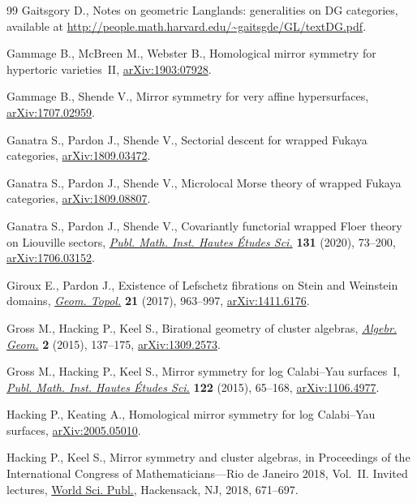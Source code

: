 \documentclass[10pt,a4paper]{amsart}
\numberwithin{equation}{section}
\begin{document}
\begin{thebibliography}{99}
Gaitsgory D., Notes on geometric {L}anglands: generalities on {DG} categories,
 available at \url{http://people.math.harvard.edu/~gaitsgde/GL/textDG.pdf}.

Gammage B., McBreen M., Webster B., Homological mirror symmetry for hypertoric
 varieties~{II}, \href{https://arxiv.org/abs/1903:07928}{arXiv:1903:07928}.

Gammage B., Shende V., Mirror symmetry for very affine hypersurfaces,
 \href{https://arxiv.org/abs/1707.02959}{arXiv:1707.02959}.

Ganatra S., Pardon J., Shende V., Sectorial descent for wrapped {F}ukaya
 categories, \href{https://arxiv.org/abs/1809.03472}{arXiv:1809.03472}.

Ganatra S., Pardon J., Shende V., Microlocal {M}orse theory of wrapped {Fukaya}
 categories, \href{https://arxiv.org/abs/1809.08807}{arXiv:1809.08807}.

Ganatra S., Pardon J., Shende V., Covariantly functorial wrapped {F}loer theory
 on {L}iouville sectors, \href{https://doi.org/10.1007/s10240-019-00112-x}{\textit{Publ. Math. Inst. Hautes \'Etudes Sci.}}
 \textbf{131} (2020), 73--200, \href{https://arxiv.org/abs/1706.03152}{arXiv:1706.03152}.


Giroux E., Pardon J., Existence of {L}efschetz fibrations on {S}tein and
 {W}einstein domains, \href{https://doi.org/10.2140/gt.2017.21.963}{\textit{Geom. Topol.}} \textbf{21} (2017), 963--997,
 \href{https://arxiv.org/abs/1411.6176}{arXiv:1411.6176}.

Gross M., Hacking P., Keel S., Birational geometry of cluster algebras,
 \href{https://doi.org/10.14231/AG-2015-007}{\textit{Algebr. Geom.}} \textbf{2} (2015), 137--175, \href{https://arxiv.org/abs/1309.2573}{arXiv:1309.2573}.

Gross M., Hacking P., Keel S., Mirror symmetry for log {C}alabi--{Y}au
 surfaces~{I}, \href{https://doi.org/10.1007/s10240-015-0073-1}{\textit{Publ. Math. Inst. Hautes \'Etudes Sci.}} \textbf{122}
 (2015), 65--168, \href{https://arxiv.org/abs/1106.4977}{arXiv:1106.4977}.

Hacking P., Keating A., Homological mirror symmetry for log {C}alabi--{Y}au
 surfaces, \href{https://arxiv.org/abs/2005.05010}{arXiv:2005.05010}.

Hacking P., Keel S., Mirror symmetry and cluster algebras, in Proceedings of
 the {I}nternational {C}ongress of {M}athematicians---{R}io de {J}aneiro 2018,
 {V}ol.~{II}. {I}nvited lectures, \href{https://doi.org/10.1142/11060}{World Sci. Publ.}, Hackensack, NJ, 2018,
 671--697.


\end{thebibliography}
\end{document}
